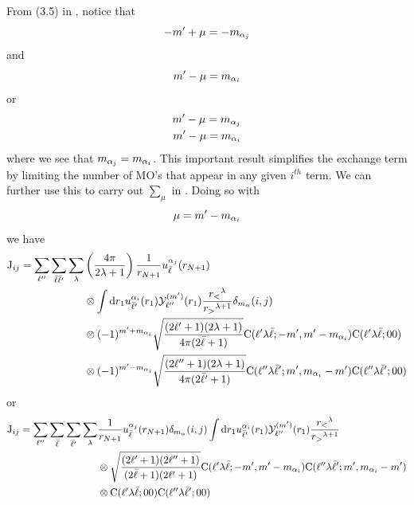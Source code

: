 \documentclass[aps,pra,groupedaddress,12pt,
               amsfonts,amssymb,
               preprint
    ]{revtex4}
\begin{document}
From (3.5) in \cite{MER1957}, notice that 
\begin{equation*}
  -m'+\mu = -m_{\alpha_j}
\end{equation*}
and
\begin{equation*}
  m'-\mu = m_{\alpha_i}
\end{equation*}
or
\begin{align*}
m' - \mu = m_{\alpha_j} \\
m' - \mu = m_{\alpha_i}
\end{align*}
where we see that $m_{\alpha_j} = m_{\alpha_i}$. This important result
simplifies the exchange term by limiting the number of MO's that appear
in any given $i^{th}$ term. We can further use this to carry out
$\sum_{\mu}$ in . Doing so with
\begin{equation}
  \label{eq:muindex}
  \mu = m' - m_{\alpha_i}
\end{equation}
we have
\begin{equation}
  \label{eq:Iexe}
  \begin{split}
  \mathrm{J}_{ij} = \sum_{\ell''}\sum_{\bar{\ell}\bar{\ell}'}\sum_{\lambda}
            & \left(\dfrac{4\pi}{2\lambda+1}\right)\dfrac{1}{r_{N+1}}u_{\bar{\ell}}^{{\alpha_j}}(r_{N+1}) \\
            & \otimes\int\mathrm{d}
               r_1u_{\bar{\ell}'}^{{\alpha_i}}(r_1)\mathcal{Y}_{\ell''}^{(m')}(r_1)\dfrac{r_<{}^\lambda}{r_>{}^{\lambda+1}}\delta_{m_\alpha}(i,j) \\
            &
            \otimes(-1)^{m'+m_{\alpha_i}}\sqrt{\dfrac{(2\ell'+1)(2\lambda+1)}{4\pi(2\bar{\ell}+1)}}\mathrm{C}(\ell'\lambda\bar{\ell};-m',m'-m_{\alpha_i})\mathrm{C}(\ell'\lambda\bar{\ell};00) \\
            & \otimes(-1)^{m'-m_{\alpha_i}}\sqrt{\dfrac{(2\ell''+1)(2\lambda+1)}{4\pi(2\bar{\ell}'+1)}}\mathrm{C}(\ell''\lambda\bar{\ell}';m',m_{\alpha_i}-m')\mathrm{C}(\ell''\lambda\bar{\ell}';00)
  \end{split}
\end{equation}
or
\begin{equation}
  \label{eq:Iexf}
  \begin{split}
  \mathrm{J}_{ij} = \sum_{\ell''}\sum_{\bar{\ell}}\sum_{\bar{\ell}'}\sum_{\lambda}
            & \dfrac{1}{r_{N+1}}u_{\bar{\ell}}^{{\alpha_j}}(r_{N+1})\delta_{m_\alpha}(i,j)\int\mathrm{d}
               r_1u_{\bar{\ell}'}^{{\alpha_i}}(r_1)\mathcal{Y}_{\ell''}^{(m')}(r_1)\dfrac{r_<{}^\lambda}{r_>{}^{\lambda+1}} \\
            & \otimes\sqrt{\dfrac{(2\ell'+1)(2\ell''+1)}{(2\bar{\ell}+1)(2\ell'+1)}}\mathrm{C}(\ell'\lambda\bar{\ell};-m',m'-m_{\alpha_i})\mathrm{C}(\ell''\lambda\bar{\ell}';m',m_{\alpha_i}-m') \\
            & \otimes\mathrm{C}(\ell'\lambda\bar{\ell};00)\mathrm{C}(\ell''\lambda\bar{\ell}';00)
  \end{split}
\end{equation}
\end{document}
